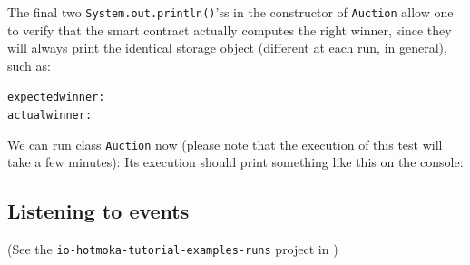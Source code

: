 The final two \texttt{System.out.println()}'ss in the constructor of
\texttt{Auction} allow one to verify that the smart contract
actually computes the right winner, since they will always print the identical storage
object (different at each run, in general), such as:
%
\begin{shellbox}\begin{alltt}
expected winner: \accountFiveShort{}
actual winner: \accountFiveShort{}
\end{alltt}\end{shellbox}

We can run class \texttt{Auction} now (please note that the execution of this test will take a few minutes):
%
%
Its execution should print something like this on the console:
%

\subsection{Listening to events}\label{subsec:listening_to_events}
%
\begin{center}
(See the \texttt{io-hotmoka-tutorial-examples-runs} project in \hotmokaRepo{})
\end{center}

